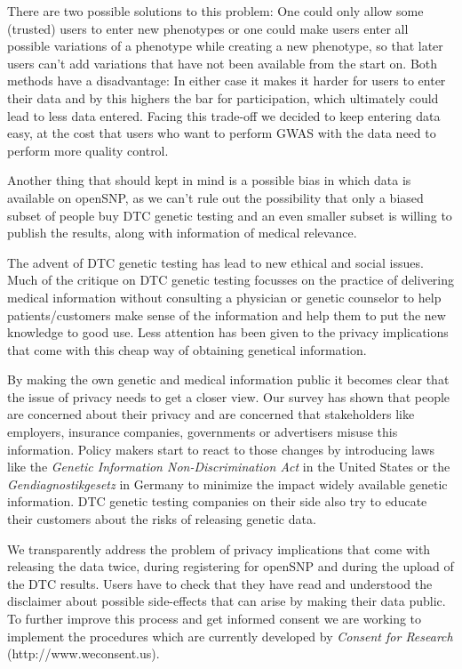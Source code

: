 \documentclass[10pt]{article}
\begin{document}
There are two possible solutions to this problem: One could only allow some (trusted) users to enter new phenotypes or one could make users enter all possible variations of a phenotype while creating a new phenotype, so that later users can't add variations that have not been available from the start on. Both methods have a disadvantage: In either case it makes it harder for users to enter their data and by this highers the bar for participation, which ultimately could lead to less data entered. Facing this trade-off we decided to keep entering data easy, at the cost that users who want to perform GWAS with the data need to perform more quality control.

Another thing that should kept in mind is a possible bias in which data is available on openSNP, as we can't rule out the possibility that only a biased subset of people buy DTC genetic testing and an even smaller subset is willing to publish the results, along with information of medical relevance.

The advent of DTC genetic testing has lead to new ethical and social issues. Much of the critique on DTC genetic testing focusses on the practice of delivering medical information without consulting a physician or genetic counselor to help patients/customers make sense of the information and help them to put the new knowledge to good use. Less attention has been given to the privacy implications that come with this cheap way of obtaining genetical information. 

By making the own genetic and medical information public it becomes clear that the issue of privacy needs to get a closer view. Our survey has shown that people are concerned about their privacy and are concerned that stakeholders like employers, insurance companies, governments or advertisers misuse this information. Policy makers start to react to those changes by introducing laws like the \textit{Genetic Information Non-Discrimination Act} in the United States or the \emph{Gendiagnostikgesetz} in Germany to minimize the impact widely available genetic information. DTC genetic testing companies on their side also try to educate their customers about the risks of releasing genetic data.  

We transparently address the problem of privacy implications that come with releasing the data twice, during registering for openSNP and during the upload of the DTC results. Users have to check that they have read and understood the disclaimer about possible side-effects that can arise by making their data public. To further improve this process and get informed consent we are working to implement the procedures which are currently developed by \textit{Consent for Research} (http://www.weconsent.us).
 
\end{document}
